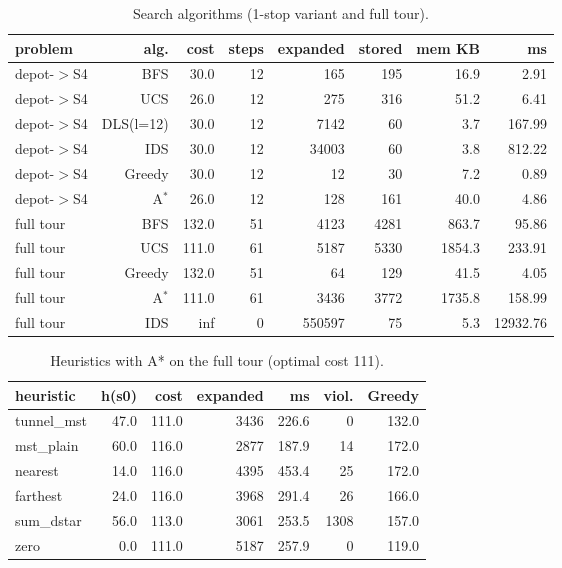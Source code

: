 
\begin{table}[t]
\centering
\footnotesize
\caption{Search algorithms (1-stop variant and full tour).}
\label{tab:alg}
\setlength{\tabcolsep}{3pt}
\begin{tabular}{lrrrrrrr}
\toprule
problem & alg. & cost & steps & expanded & stored & mem KB & ms \\
\midrule
depot-$>$S4 & BFS & 30.0 & 12 & 165 & 195 & 16.9 & 2.91 \\
depot-$>$S4 & UCS & 26.0 & 12 & 275 & 316 & 51.2 & 6.41 \\
depot-$>$S4 & DLS(l=12) & 30.0 & 12 & 7142 & 60 & 3.7 & 167.99 \\
depot-$>$S4 & IDS & 30.0 & 12 & 34003 & 60 & 3.8 & 812.22 \\
depot-$>$S4 & Greedy & 30.0 & 12 & 12 & 30 & 7.2 & 0.89 \\
depot-$>$S4 & A$^*$ & 26.0 & 12 & 128 & 161 & 40.0 & 4.86 \\
full tour & BFS & 132.0 & 51 & 4123 & 4281 & 863.7 & 95.86 \\
full tour & UCS & 111.0 & 61 & 5187 & 5330 & 1854.3 & 233.91 \\
full tour & Greedy & 132.0 & 51 & 64 & 129 & 41.5 & 4.05 \\
full tour & A$^*$ & 111.0 & 61 & 3436 & 3772 & 1735.8 & 158.99 \\
full tour & IDS & inf & 0 & 550597 & 75 & 5.3 & 12932.76 \\
\bottomrule
\end{tabular}
\end{table}

\begin{table}[t]
\centering
\footnotesize
\caption{Heuristics with A* on the full tour (optimal cost 111).}
\label{tab:heur}
\setlength{\tabcolsep}{3pt}
\begin{tabular}{lrrrrrr}
\toprule
heuristic & h(s0) & cost & expanded & ms & viol. & Greedy \\
\midrule
tunnel\_mst & 47.0 & 111.0 & 3436 & 226.6 & 0 & 132.0 \\
mst\_plain & 60.0 & 116.0 & 2877 & 187.9 & 14 & 172.0 \\
nearest & 14.0 & 116.0 & 4395 & 453.4 & 25 & 172.0 \\
farthest & 24.0 & 116.0 & 3968 & 291.4 & 26 & 166.0 \\
sum\_dstar & 56.0 & 113.0 & 3061 & 253.5 & 1308 & 157.0 \\
zero & 0.0 & 111.0 & 5187 & 257.9 & 0 & 119.0 \\
\bottomrule
\end{tabular}
\end{table}

